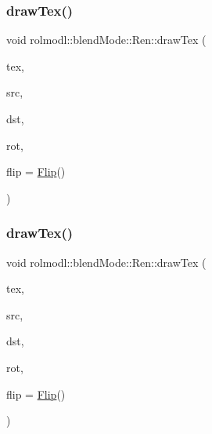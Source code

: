 \mbox{\label{classrolmodl_1_1blend_mode_1_1_ren_a3cb7f52b90797c4c5429dcca9fee47bc}} 
\subsubsection{\texorpdfstring{drawTex()}{drawTex()}\hspace{0.1cm}{\footnotesize\ttfamily [30/36]}}
{\footnotesize\ttfamily void rolmodl\+::blend\+Mode\+::\+Ren\+::draw\+Tex (\begin{DoxyParamCaption}\item[{Tex \&}]{tex,  }\item[{const \mbox{\hyperlink{structrolmodl_1_1blend_mode_1_1_src_rect_w_h}{Src\+Rect\+WH}}}]{src,  }\item[{const \mbox{\hyperlink{structrolmodl_1_1blend_mode_1_1_dst_rect_x_y}{Dst\+Rect\+XY}}}]{dst,  }\item[{const double}]{rot,  }\item[{const \mbox{\hyperlink{structrolmodl_1_1blend_mode_1_1_flip}{Flip}}}]{flip = {\ttfamily \mbox{\hyperlink{structrolmodl_1_1blend_mode_1_1_flip}{Flip}}()} }\end{DoxyParamCaption})}

\mbox{\label{classrolmodl_1_1blend_mode_1_1_ren_abea6eb70b2024cff14ac9d26ffadacd4}} 
\subsubsection{\texorpdfstring{drawTex()}{drawTex()}\hspace{0.1cm}{\footnotesize\ttfamily [31/36]}}
{\footnotesize\ttfamily void rolmodl\+::blend\+Mode\+::\+Ren\+::draw\+Tex (\begin{DoxyParamCaption}\item[{Tex \&}]{tex,  }\item[{const \mbox{\hyperlink{structrolmodl_1_1blend_mode_1_1_src_rect_x_y}{Src\+Rect\+XY}}}]{src,  }\item[{const \mbox{\hyperlink{structrolmodl_1_1blend_mode_1_1_dst_rect_w_h}{Dst\+Rect\+WH}}}]{dst,  }\item[{const double}]{rot,  }\item[{const \mbox{\hyperlink{structrolmodl_1_1blend_mode_1_1_flip}{Flip}}}]{flip = {\ttfamily \mbox{\hyperlink{structrolmodl_1_1blend_mode_1_1_flip}{Flip}}()} }\end{DoxyParamCaption})}

